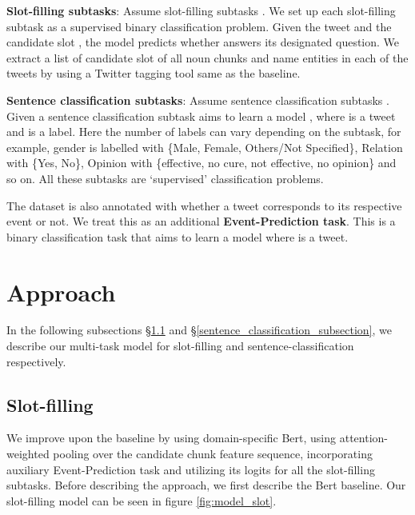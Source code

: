 \documentclass[11pt,a4paper]{article}
\begin{document}
\textbf{Slot-filling subtasks}: Assume  slot-filling subtasks . We set up each slot-filling subtask  as a supervised binary classification problem. Given the tweet  and the candidate slot , the model  predicts whether  answers its designated question. We extract a list of candidate slot of all noun chunks and name entities in each of the tweets by using a Twitter tagging tool \cite{ritteretal-2011named} same as the baseline.

\textbf{Sentence classification subtasks}: Assume  sentence classification subtasks . Given a sentence classification subtask  aims to learn a model , where  is a tweet and  is a label. Here the number of labels can vary depending on the subtask, for example, gender is labelled with \{Male, Female, Others/Not Specified\}, Relation with \{Yes, No\}, Opinion with \{effective, no cure, not effective, no opinion\} and so on. All these subtasks are `supervised' classification problems.

The dataset is also annotated with whether a tweet corresponds to its respective event or not. We treat this as an additional \textbf{Event-Prediction task}. This is a binary classification task that aims to learn a model  where  is a tweet.










\section{Approach}\label{approach_section}



In the following subsections \S \ref{slot_filling_subsection} and \S \ref{sentence_classification_subsection}, we describe our multi-task model for slot-filling and sentence-classification respectively.

\subsection{Slot-filling} \label{slot_filling_subsection}
We improve upon the baseline \cite{zong2020extracting} by using domain-specific Bert, using attention-weighted pooling over the candidate chunk feature sequence, incorporating auxiliary Event-Prediction task and utilizing its logits for all the slot-filling subtasks. Before describing the approach, we first describe the Bert baseline. Our slot-filling model can be seen in figure \ref{fig:model_slot}.
\end{document}
